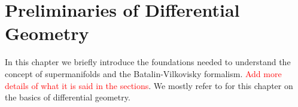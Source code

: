 \chapter{Preliminaries of Differential Geometry}
\label{chap:diff_geom}

In this chapter we briefly introduce the foundations needed to understand the concept of supermanifolds and the Batalin-Vilkovisky formalism.
\textcolor{red}{Add more details of what it is said in the sections}.
We mostly refer to \cite{Nima} for this chapter on the basics of differential geometry.





